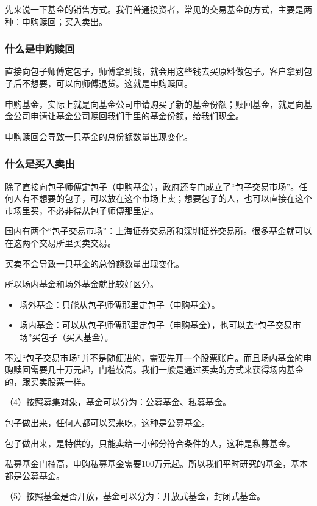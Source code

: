 先来说一下基金的销售方式。我们普通投资者，常见的交易基金的方式，主要是两种：申购赎回；买入卖出。

\subsubsection{什么是申购赎回}

直接向包子师傅定包子，师傅拿到钱，就会用这些钱去买原料做包子。客户拿到包子后不想要，可以向师傅退货。这就是申购赎回。

申购基金，实际上就是向基金公司申请购买了新的基金份额；赎回基金，就是向基金公司申请让基金公司赎回我们手里的基金份额，给我们现金。

申购赎回会导致一只基金的总份额数量出现变化。

\subsubsection{什么是买入卖出}

除了直接向包子师傅定包子（申购基金），政府还专门成立了“包子交易市场”。任何人有不想要的包子，可以放在这个市场上卖；想要包子的人，也可以直接在这个市场里买，不必非得从包子师傅那里定。

国内有两个“包子交易市场”：上海证券交易所和深圳证券交易所。很多基金就可以在这两个交易所里买卖交易。

买卖不会导致一只基金的总份额数量出现变化。

所以场内基金和场外基金就比较好区分。

\begin{itemize}
\item 场外基金：只能从包子师傅那里定包子（申购基金）。
\item 场内基金：可以从包子师傅那里定包子（申购基金），也可以去“包子交易市场”买包子（买入基金）。
\end{itemize}

不过“包子交易市场”并不是随便进的，需要先开一个股票账户。而且场内基金的申购赎回需要几十万元起，门槛较高。我们一般是通过买卖的方式来获得场内基金的，跟买卖股票一样。

（4）按照募集对象，基金可以分为：公募基金、私募基金。

包子做出来，任何人都可以买来吃，这种是公募基金。

包子做出来，是特供的，只能卖给一小部分符合条件的人，这种是私募基金。

私募基金门槛高，申购私募基金需要100万元起。所以我们平时研究的基金，基本都是公募基金。

（5）按照基金是否开放，基金可以分为：开放式基金，封闭式基金。

